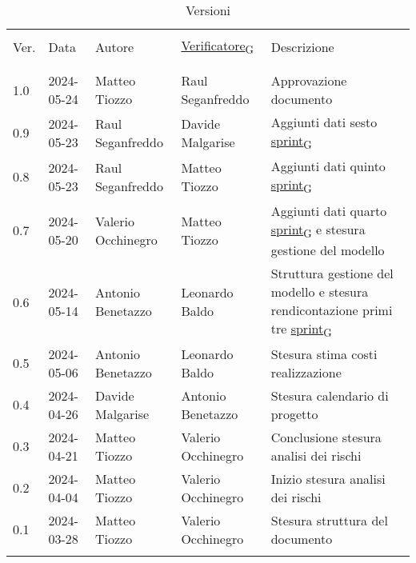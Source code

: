 \documentclass[12pt]{article} %
\begin{document}


\newpage



\begin{table}[!h]
	\footnotesize
	\begin{center}
		\caption*{Versioni}
		\vspace{0.5cm}
		\begin{tabular}{ l l l l p{6cm} }
			\hline                                                                                          \\[-2ex]
			Ver. & Data & Autore & \href{https://7last.github.io/docs/pb/documentazione-interna/glossario\#verificatore}{Verificatore\textsubscript{G}} & Descrizione \\
			\\[-2ex] \hline \\[-1.5ex]
			1.0 & 2024-05-24 & Matteo Tiozzo & Raul Seganfreddo & Approvazione documento\\
			0.9 & 2024-05-23 & Raul Seganfreddo & Davide Malgarise & Aggiunti dati sesto \href{https://7last.github.io/docs/pb/documentazione-interna/glossario\#sprint}{sprint\textsubscript{G}}\\
			0.8 & 2024-05-23 & Raul Seganfreddo & Matteo Tiozzo & Aggiunti dati quinto \href{https://7last.github.io/docs/pb/documentazione-interna/glossario\#sprint}{sprint\textsubscript{G}}\\
			0.7 & 2024-05-20 & Valerio Occhinegro & Matteo Tiozzo & Aggiunti dati quarto \href{https://7last.github.io/docs/pb/documentazione-interna/glossario\#sprint}{sprint\textsubscript{G}} e stesura gestione del modello \\
			0.6 & 2024-05-14 & Antonio Benetazzo & Leonardo Baldo  & Struttura gestione del modello e stesura rendicontazione primi tre \href{https://7last.github.io/docs/pb/documentazione-interna/glossario\#sprint}{sprint\textsubscript{G}}  \\
			0.5 & 2024-05-06 & Antonio Benetazzo & Leonardo Baldo & Stesura stima costi realizzazione \\
			0.4 & 2024-04-26 & Davide Malgarise & Antonio Benetazzo & Stesura calendario di progetto \\
			0.3 & 2024-04-21 & Matteo Tiozzo & Valerio Occhinegro & Conclusione stesura analisi dei rischi \\
			0.2 & 2024-04-04 & Matteo Tiozzo & Valerio Occhinegro & Inizio stesura analisi dei rischi \\
			0.1 & 2024-03-28 & Matteo Tiozzo & Valerio Occhinegro & Stesura struttura del documento \\
			\\[-1.5ex] \hline
		\end{tabular}
	\end{center}
\end{table}
\end{document}
